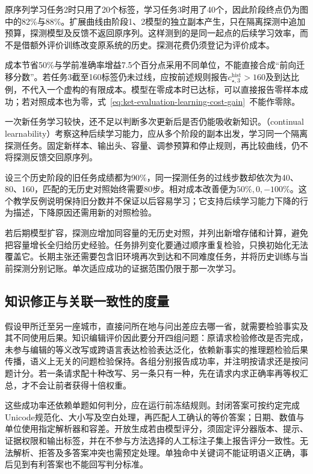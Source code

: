 原序列学习任务2时只用了20个标签，学习任务3时用了40个，因此阶段终点仍为图中的82\%与88\%。扩展曲线由阶段1、2模型的独立副本产生，只在隔离探测中追加预算，探测模型及反馈不返回原序列。这样测到的是同一起点的后续学习效率，而不是借额外评价训练改变原系统的历史。探测花费仍须登记为评价成本。

成本节省50\%与学前准确率增益7.5个百分点采用不同单位，不能直接合成“前向迁移分数”。若任务3截至160标签仍未过线，应按前述规则报告$c_{\star,3}^{\mathrm{hist}}>160$及到达比例，不代入一个虚构的有限成本。模型在零成本时已达标，可以直接报告零样本成功；若对照成本也为零，式~\eqref{eq:ket-evaluation-learning-cost-gain}~不能作零除。

一次新任务学习较快，还不足以判断多次更新后是否仍能吸收新知识。（continual learnability）考察这种后续学习能力，应从多个阶段的副本出发，学习同一个隔离探测任务。固定新样本、输出头、容量、调参预算和停止规则，再比较曲线，仍不将探测反馈交回原序列。

设三个历史阶段的旧任务成绩都为90\%，同一探测任务的过线步数却依次为40、80、160，匹配的无历史对照始终需要80步。相对成本改善便为$50\%,0,-100\%$。这个教学反例说明保持旧分数并不保证以后容易学习；它支持后续学习能力下降的行为描述，下降原因还需用新的对照检验。

若后期模型扩容，探测应增加同容量的无历史对照，并列出新增存储和计算，避免把容量增长全归给历史经验。任务排列变化要通过顺序重复检验，只换初始化无法覆盖它。长期主张还需要包含旧环境再次到达和不同难度任务，并将历史训练与当前探测分别记账。单次适应成功的证据范围仍限于那一次学习。

\subsection{知识修正与关联一致性的度量}
\label{sec:ket-evaluation-editing}

假设甲所迁至另一座城市，直接问所在地与问出差应去哪一省，就需要检验事实及其不同使用后果。知识编辑评价因此要分开四组问题：原请求检验修改是否完成，未参与编辑的等义改写或跨语言表达检验表达泛化，依赖新事实的推理题检验后果传播，语义上无关的问题检验保持。各组分别报告成功率，并注明按请求还是按问题计分。若一条请求配十种改写、另一条只有一种，先在请求内求正确率再等权汇总，才不会让前者获得十倍权重。

这些成功率还依赖单题如何判分，应在运行前冻结规则。封闭答案可按约定完成Unicode规范化、大小写及空白处理，再匹配人工确认的等价答案；日期、数值与单位使用指定解析器和容差。开放生成若由模型评分，须固定评分器版本、提示、证据权限和输出标签，并在不参与方法选择的人工标注子集上报告评分一致性。无法解析、拒答及多答案冲突也需预定处理。单独命中关键词不能证明语义正确，事后见到有利答案也不能回写判分标准。

